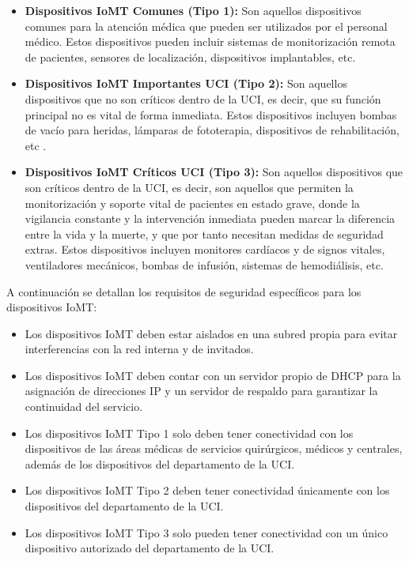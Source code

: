 \begin{itemize}
    \item \textbf{Dispositivos IoMT Comunes (Tipo 1):} Son aquellos dispositivos comunes para la atención médica que pueden ser utilizados por el personal 
    médico. Estos dispositivos pueden incluir sistemas de monitorización remota de pacientes, sensores de localización, dispositivos implantables, etc.
    \item \textbf{Dispositivos IoMT Importantes UCI (Tipo 2):} Son aquellos dispositivos que no son críticos dentro de la UCI, es decir, que su función principal no es vital de forma 
    inmediata. Estos dispositivos incluyen bombas de vacío para heridas, lámparas de fototerapia, dispositivos de rehabilitación, etc \cite{IoMT-UCI}.
    \item \textbf{Dispositivos IoMT Críticos UCI (Tipo 3):} Son aquellos dispositivos que son críticos dentro de la UCI, es decir, son aquellos que permiten la monitorización y soporte
    vital de pacientes en estado grave, donde la vigilancia constante y la intervención inmediata pueden marcar la diferencia entre la vida y la muerte, y que por tanto necesitan medidas
    de seguridad extras. Estos dispositivos incluyen monitores cardíacos y de signos vitales, ventiladores mecánicos, bombas de infusión, sistemas de hemodiálisis, etc\cite{IoMT-UCI}.
\end{itemize}
A continuación se detallan los requisitos de seguridad específicos para los dispositivos IoMT:
\begin{itemize}
    \item Los dispositivos IoMT deben estar aislados en una subred propia para evitar interferencias con la red interna y de invitados.
    \item Los dispositivos IoMT deben contar con un servidor propio de DHCP para la asignación de direcciones IP y un servidor de respaldo para garantizar la continuidad del servicio.
    \item Los dispositivos IoMT Tipo 1 solo deben tener conectividad con los dispositivos de las áreas médicas de servicios quirúrgicos, médicos y centrales, 
    además de los dispositivos del departamento de la UCI.
    \item Los dispositivos IoMT Tipo 2 deben tener conectividad únicamente con los dispositivos del departamento de la UCI.
    \item Los dispositivos IoMT Tipo 3 solo pueden tener conectividad con un único dispositivo autorizado del departamento de la UCI.
\end{itemize}
